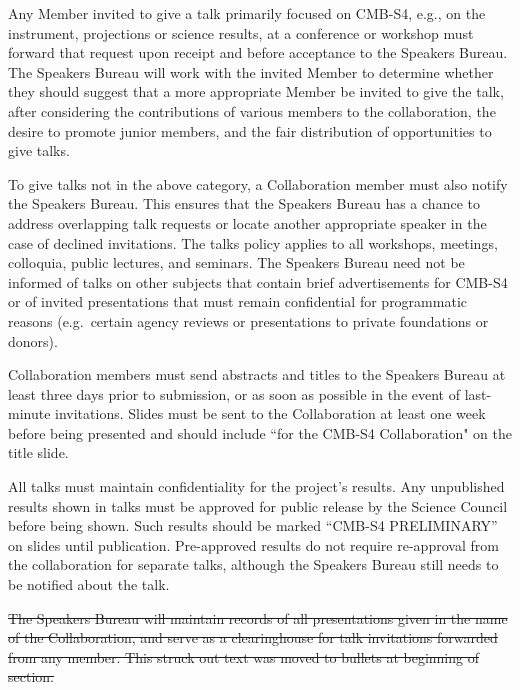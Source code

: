 \documentclass[12pt]{article}
\begin{document}
{\color{red}
Any Member invited to give a talk primarily focused on CMB-S4, e.g., on the instrument, projections or science results, at a conference or workshop must forward that request upon receipt and before acceptance to the Speakers Bureau.  The Speakers Bureau will work with the invited Member to determine whether they should suggest that a more appropriate Member be invited to give the talk, after considering 
the contributions of various members to the collaboration, the desire to promote junior members, and the fair distribution of opportunities to give talks.

To give talks not in the above category, a Collaboration member must also notify the Speakers Bureau. This ensures that the Speakers Bureau has a chance to address overlapping talk requests or locate another appropriate speaker in the case of declined invitations.  The talks policy applies to all workshops, meetings, colloquia, public lectures, and seminars.  The Speakers Bureau need not be informed of talks on other subjects that contain brief advertisements for CMB-S4 or of invited presentations that must remain confidential for programmatic reasons (e.g.~certain agency reviews or presentations to private foundations or donors).


Collaboration members must send abstracts and titles to the Speakers Bureau at least three days prior to submission, or as soon as possible in the event of last-minute invitations. Slides must be sent to the Collaboration at least one week before being presented and should include ``for the CMB-S4 Collaboration" on the title slide.

All talks must maintain confidentiality for the project's results.
Any unpublished results shown in talks must be approved for public release by the Science Council before being shown. Such results should be marked ``CMB-S4 PRELIMINARY'' on slides until publication.
Pre-approved results do not require re-approval from the collaboration for separate talks, although the Speakers Bureau still needs to be notified about the talk.




\sout{The Speakers Bureau will maintain records of all presentations given in the name of the Collaboration, and serve as a clearinghouse for talk invitations forwarded from any member. This struck out text was moved to bullets at beginning of section.}
}
\end{document}
